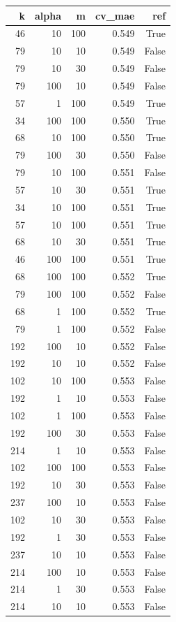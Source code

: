 \begin{tabular}{rrrrr}
\toprule
k & alpha & m & cv_mae & ref \\
\midrule
46 & 10 & 100 & 0.549 & True \\
79 & 10 & 10 & 0.549 & False \\
79 & 10 & 30 & 0.549 & False \\
79 & 100 & 10 & 0.549 & False \\
57 & 1 & 100 & 0.549 & True \\
34 & 100 & 100 & 0.550 & True \\
68 & 10 & 100 & 0.550 & True \\
79 & 100 & 30 & 0.550 & False \\
79 & 10 & 100 & 0.551 & False \\
57 & 10 & 30 & 0.551 & True \\
34 & 10 & 100 & 0.551 & True \\
57 & 10 & 100 & 0.551 & True \\
68 & 10 & 30 & 0.551 & True \\
46 & 100 & 100 & 0.551 & True \\
68 & 100 & 100 & 0.552 & True \\
79 & 100 & 100 & 0.552 & False \\
68 & 1 & 100 & 0.552 & True \\
79 & 1 & 100 & 0.552 & False \\
192 & 100 & 10 & 0.552 & False \\
192 & 10 & 10 & 0.552 & False \\
102 & 10 & 100 & 0.553 & False \\
192 & 1 & 10 & 0.553 & False \\
102 & 1 & 100 & 0.553 & False \\
192 & 100 & 30 & 0.553 & False \\
214 & 1 & 10 & 0.553 & False \\
102 & 100 & 100 & 0.553 & False \\
192 & 10 & 30 & 0.553 & False \\
237 & 100 & 10 & 0.553 & False \\
102 & 10 & 30 & 0.553 & False \\
192 & 1 & 30 & 0.553 & False \\
237 & 10 & 10 & 0.553 & False \\
214 & 100 & 10 & 0.553 & False \\
214 & 1 & 30 & 0.553 & False \\
214 & 10 & 10 & 0.553 & False \\

\end{tabular}
